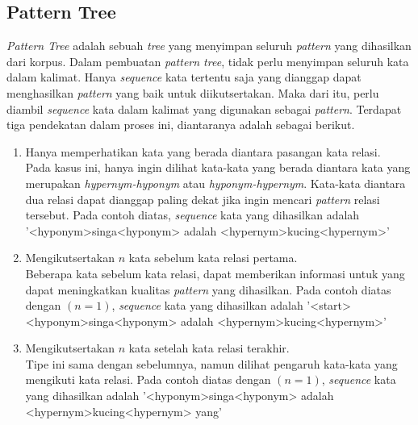 \subsection{Pattern Tree}
\textit{Pattern Tree} adalah sebuah \textit{tree} yang menyimpan seluruh \textit{pattern} yang dihasilkan dari korpus. Dalam pembuatan \textit{pattern tree}, tidak perlu menyimpan seluruh kata dalam kalimat. Hanya \textit{sequence} kata tertentu saja yang dianggap dapat menghasilkan \textit{pattern} yang baik untuk diikutsertakan. Maka dari itu, perlu diambil \textit{sequence} kata dalam kalimat yang digunakan sebagai \textit{pattern}. Terdapat tiga pendekatan dalam proses ini, diantaranya adalah sebagai berikut.
\begin{enumerate}
  \item Hanya memperhatikan kata yang berada diantara pasangan kata relasi. \\
  Pada kasus ini, hanya ingin dilihat kata-kata yang berada diantara kata yang merupakan \textit{hypernym-hyponym} atau \textit{hyponym-hypernym}. Kata-kata diantara dua relasi dapat dianggap paling dekat jika ingin mencari \textit{pattern} relasi tersebut. Pada contoh diatas, \textit{sequence} kata yang dihasilkan adalah '<hyponym>singa<hyponym> adalah <hypernym>kucing<hypernym>'
  \item Mengikutsertakan $n$ kata sebelum kata relasi pertama. \\
  Beberapa kata sebelum kata relasi, dapat memberikan informasi untuk yang dapat meningkatkan kualitas \textit{pattern} yang dihasilkan. Pada contoh diatas dengan $(n=1)$, \textit{sequence} kata yang dihasilkan adalah '<start> <hyponym>singa<hyponym> adalah <hypernym>kucing<hypernym>'
  \item Mengikutsertakan $n$ kata setelah kata relasi terakhir. \\
  Tipe ini sama dengan sebelumnya, namun dilihat pengaruh kata-kata yang mengikuti kata relasi. Pada contoh diatas dengan $(n=1)$, \textit{sequence} kata yang dihasilkan adalah '<hyponym>singa<hyponym> adalah <hypernym>kucing<hypernym> yang'
\end{enumerate}
